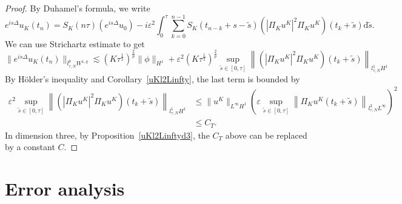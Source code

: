 \documentclass[10pt,a4paper]{article}
\begin{document}
  \begin{proof}
    By Duhamel's formula, we write
    \begin{equation}
      e^{is\Delta}u_K(t_n) = S_K(n\tau) (e^{is\Delta} u_0) 
      -i\varepsilon^2 \int_{0}^{\tau} \sum_{k=0}^{n-1} S_K(t_{n-k}+s-\tilde{s}) 
      \left(|\Pi_K u^K|^2 \Pi_K u^K\right)(t_k+\tilde{s}) \mathrm{d} \tilde{s}.
    \end{equation}
    We can use Strichartz estimate to get
      \[ \|e^{is\Delta} u_K(t_n)\|_{l^p_{\tau,N}W^{1,q}} \lesssim
      (K\tau^\frac12)^\frac2p \|\phi\|_{H^1} 
      + \varepsilon^2
      (K\tau^\frac12)^\frac2p \sup_{\tilde{s}\in[0,\tau]}\left\| 
      \left(|\Pi_K u^K|^2 \Pi_K u^K\right)(t_k+\tilde{s}) \right\|_{l^1_{\tau,N}H^1} \]
    By H\"older's inequality and Corollary~\ref{uKl2Linfty}, the last term is
    bounded by
    \begin{equation*}
      \begin{aligned}
        \varepsilon^2 \sup_{\tilde{s}\in[0,\tau]}\left\| 
        \left(|\Pi_K u^K|^2 \Pi_K u^K\right)(t_k+\tilde{s}) \right\|_{l^1_{\tau,N}H^1} 
        &\leq \|u^K\|_{L^\infty H^1} \left( \varepsilon \sup_{\tilde{s} \in [0,\tau]} 
        \left\|\Pi_K u^K(t_k+\tilde{s})\right\|_{l_{\tau, N}^2
        L^{\infty}}\right)^2\\
        &\leq C_T.
      \end{aligned}
    \end{equation*}
    In dimension three, by Proposition~\ref{uKl2Linftyd3}, the \(C_T\) above can be
    replaced by a constant \(C\).
  \end{proof}

  \section{Error analysis}\label{sec:err-anal}
\end{document}
